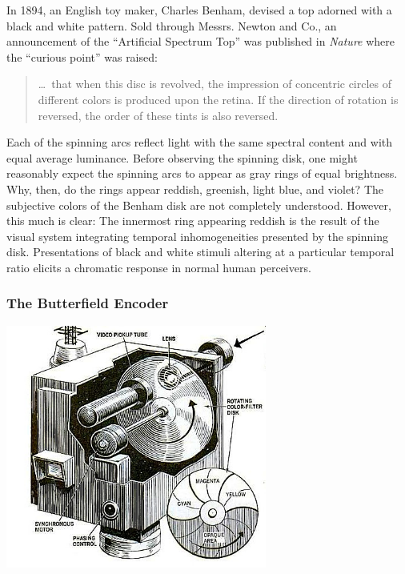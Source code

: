 In 1894, an English toy maker, Charles Benham, devised a top adorned with a black and white pattern. Sold through Messrs. Newton and Co., an announcement of the ``Artificial Spectrum Top'' was published in \emph{Nature} where the ``curious point'' was raised:
	\begin{quote}
		\ldots\ that when this disc is revolved, the impression of concentric circles of different colors is produced upon the retina. If the direction of rotation is reversed, the order of these tints is also reversed. 
	\end{quote}
Each of the spinning arcs reflect light with the same spectral content and with equal average luminance. Before observing the spinning disk, one might reasonably expect the spinning arcs to appear as gray rings of equal brightness. Why, then, do the rings appear reddish, greenish, light blue, and violet? The subjective colors of the Benham disk are not completely understood. However, this much is clear: The innermost ring appearing reddish is the result of the visual system integrating temporal inhomogeneities presented by the spinning disk. Presentations of black and white stimuli altering at a particular temporal ratio elicits a chromatic response in normal human perceivers. \change

\begin{frame}[t]\frametitle{The Butterfield Encoder}
	\begin{center}
		\includegraphics[height=8cm]{../../graphics/color_encoder.jpg}
	\end{center}
\end{frame}


